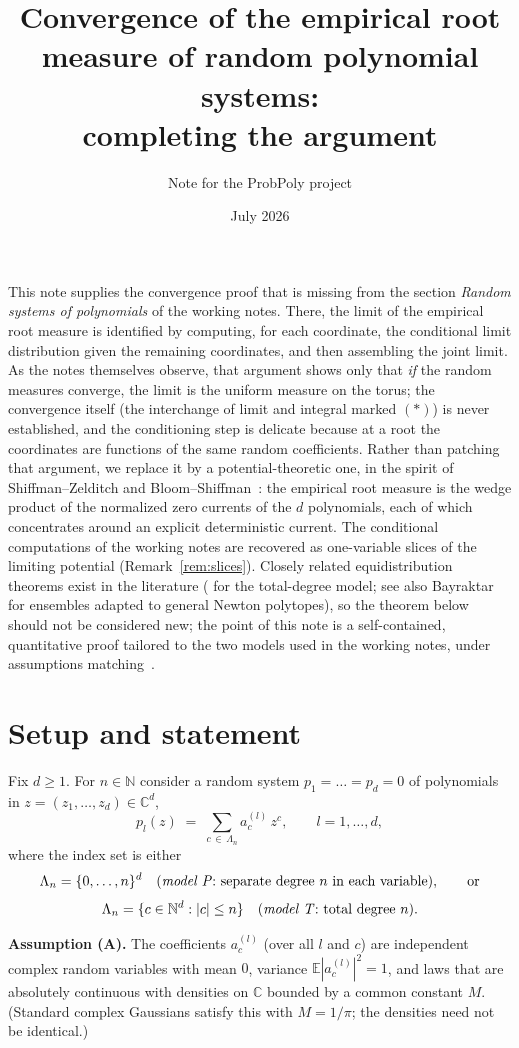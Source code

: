 \documentclass[12pt]{article}
\title{Convergence of the empirical root measure of random polynomial
systems:\\ completing the argument}
\author{Note for the ProbPoly project}
\date{July 2026}
\def\C{\mathbb{C}}
\def\N{\mathbb{N}}
\def\E{\mathbb{E}}
\begin{document}
\maketitle

\noindent
This note supplies the convergence proof that is missing from the section
\emph{Random systems of polynomials} of the working notes. There, the limit of the
empirical root measure is identified by computing, for each coordinate, the conditional
limit distribution given the remaining coordinates, and then assembling the joint limit.
As the notes themselves observe, that argument shows only that \emph{if} the random
measures converge, the limit is the uniform measure on the torus; the convergence itself
(the interchange of limit and integral marked $(*)$) is never established, and the
conditioning step is delicate because at a root the coordinates are functions of the same
random coefficients. Rather than patching that argument, we replace it by a
potential-theoretic one, in the spirit of Shiffman--Zelditch and
Bloom--Shiffman~\cite{BS07}: the empirical root measure is the wedge product of the
normalized zero currents of the $d$ polynomials, each of which concentrates around an
explicit deterministic current. The conditional computations of the working notes are
recovered as one-variable slices of the limiting potential (Remark~\ref{rem:slices}).
Closely related equidistribution theorems exist in the literature (\cite{BS07} for the
total-degree model; see also Bayraktar~\cite{Bay16} for ensembles adapted to general
Newton polytopes), so the theorem below should not be considered new; the point of this
note is a self-contained, quantitative proof tailored to the two models used in the
working notes, under assumptions matching~\cite{BN}.

\section{Setup and statement}

Fix $d \geq 1$. For $n \in \N$ consider a random system $p_1 = \dots = p_d = 0$ of
polynomials in $z = (z_1,\dots,z_d) \in \C^d$,
\[
  p_l(z) \;=\; \sum_{c \,\in\, \Lambda_n} a^{(l)}_c\, z^c, \qquad l = 1,\dots,d,
\]
where the index set is either
\[
  \Lambda_n = \{0,\dots,n\}^d \quad \text{(\emph{model P}: separate degree $n$ in each
  variable)}, \qquad \text{or}
\]
\[
  \Lambda_n = \{c \in \N^d : |c| \le n\} \quad \text{(\emph{model T}: total degree $n$)}.
\]

\medskip\noindent
\textbf{Assumption (A).} The coefficients $a^{(l)}_c$ (over all $l$ and $c$) are
independent complex random variables with mean $0$, variance
$\E|a^{(l)}_c|^2 = 1$, and laws that are absolutely continuous with densities on $\C$
bounded by a common constant $M$. (Standard complex Gaussians satisfy this with
$M = 1/\pi$; the densities need not be identical.)
\end{document}

